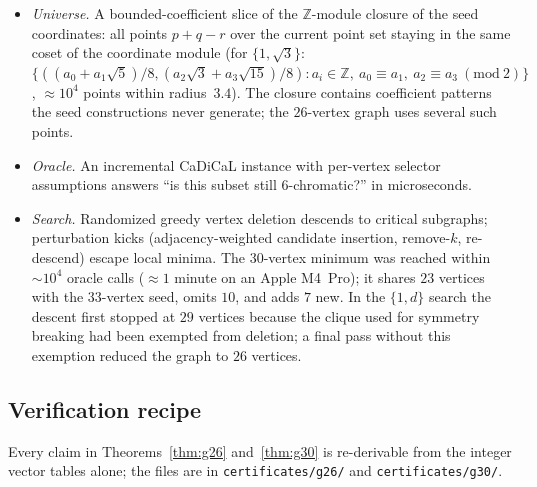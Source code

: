 \documentclass[11pt]{article}
\theoremstyle{definition}
\theoremstyle{remark}
\newcommand{\Z}{\mathbb{Z}}
\newcommand{\dd}{d}                          %
\begin{document}
\begin{itemize}
\item \emph{Universe.}  A bounded-coefficient slice of the $\Z$-module
closure of the seed coordinates: all points $p+q-r$ over the current
point set staying in the same coset of the coordinate module (for
$\{1,\sqrt3\}$: $\{((a_0+a_1\sqrt5)/8,(a_2\sqrt3+a_3\sqrt{15})/8):
a_i\in\Z,\ a_0\equiv a_1,\ a_2\equiv a_3\ (\mathrm{mod}\ 2)\}$,
$\approx10^4$ points within radius~$3.4$).  The closure contains
coefficient patterns the seed constructions never generate; the
$26$-vertex graph uses several such points.
\item \emph{Oracle.}  An incremental CaDiCaL instance with per-vertex
selector assumptions answers ``is this subset still $6$-chromatic?'' in
microseconds.
\item \emph{Search.}  Randomized greedy vertex deletion descends to
critical subgraphs; perturbation kicks (adjacency-weighted candidate
insertion, remove-$k$, re-descend) escape local minima.  The $30$-vertex
minimum was reached within $\sim10^4$ oracle calls ($\approx1$ minute on
an Apple M4~Pro); it shares $23$ vertices with the $33$-vertex seed,
omits $10$, and adds $7$ new.  In the $\{1,\dd\}$ search the descent
first stopped at $29$ vertices because the clique used for symmetry
breaking had been exempted from deletion; a final pass without this
exemption reduced the graph to $26$ vertices.
\end{itemize}

\subsection{Verification recipe}\label{sec:verify}

Every claim in Theorems~\ref{thm:g26} and~\ref{thm:g30} is re-derivable
from the integer vector tables alone; the files are in
\texttt{certificates/g26/} and \texttt{certificates/g30/}.
\end{document}

